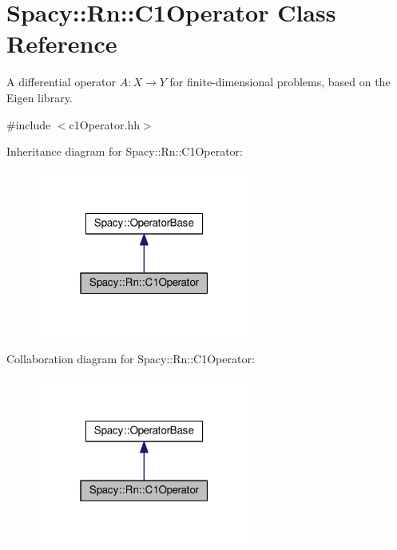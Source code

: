 \hypertarget{classSpacy_1_1Rn_1_1C1Operator}{}\section{Spacy\+:\+:Rn\+:\+:C1\+Operator Class Reference}
\label{classSpacy_1_1Rn_1_1C1Operator}


A differential operator $A:X\rightarrow Y$ for finite-\/dimensional problems, based on the Eigen library.  




{\ttfamily \#include $<$c1\+Operator.\+hh$>$}



Inheritance diagram for Spacy\+:\+:Rn\+:\+:C1\+Operator\+:\nopagebreak
\begin{figure}[H]
\begin{center}
\leavevmode
\includegraphics[width=199pt]{classSpacy_1_1Rn_1_1C1Operator__inherit__graph}
\end{center}
\end{figure}


Collaboration diagram for Spacy\+:\+:Rn\+:\+:C1\+Operator\+:\nopagebreak
\begin{figure}[H]
\begin{center}
\leavevmode
\includegraphics[width=199pt]{classSpacy_1_1Rn_1_1C1Operator__coll__graph}
\end{center}
\end{figure}
